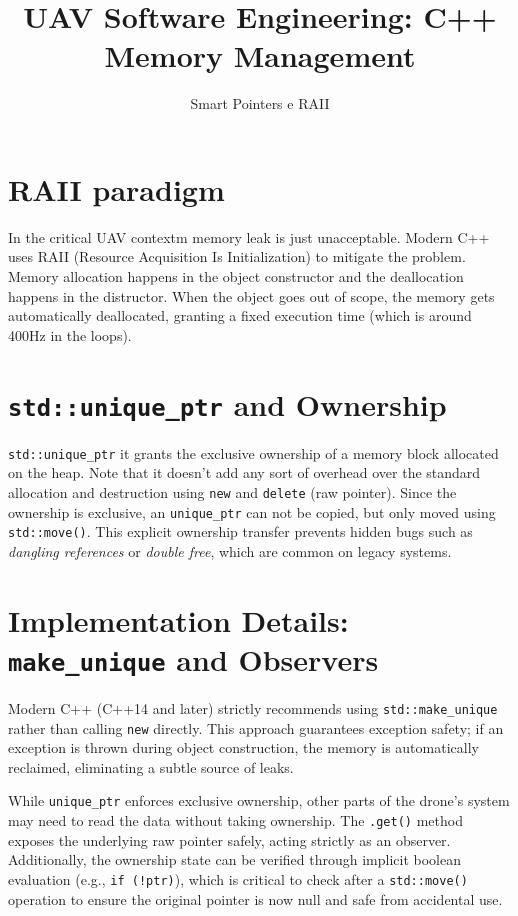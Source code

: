 \documentclass{article}
\title{UAV Software Engineering: C++ Memory Management}
\author{Smart Pointers e RAII}
\date{}
\begin{document}
\maketitle

\section{RAII paradigm}
In the critical UAV contextm memory leak is just unacceptable. 
Modern C++ uses RAII (Resource Acquisition Is Initialization) to mitigate the problem. 
Memory allocation happens in the object constructor and the deallocation happens in the distructor. 
When the object goes out of scope, the memory gets automatically deallocated, granting a fixed execution time (which is around 400Hz in the loops).

\section{\texttt{std::unique\_ptr} and Ownership}
\texttt{std::unique\_ptr} it grants the exclusive ownership of a memory block allocated on the heap. 
Note that it doesn't add any sort of overhead over the standard allocation and destruction using \texttt{new} and \texttt{delete} (raw pointer).
Since the ownership is exclusive, an \texttt{unique\_ptr} can not be copied, but only moved using \texttt{std::move()}. 
This explicit ownership transfer prevents hidden bugs such as \textit{dangling references} or \textit{double free}, which are common on legacy systems.

\section{Implementation Details: \texttt{make\_unique} and Observers}
Modern C++ (C++14 and later) strictly recommends using \texttt{std::make\_unique} rather than calling \texttt{new} directly. 
This approach guarantees exception safety; if an exception is thrown during object construction, the memory is automatically reclaimed, 
eliminating a subtle source of leaks.

While \texttt{unique\_ptr} enforces exclusive ownership, other parts of the drone's system may need to read the data without taking ownership.
The \texttt{.get()} method exposes the underlying raw pointer safely, acting strictly as an observer. 
Additionally, the ownership state can be verified through implicit boolean evaluation (e.g., \texttt{if (!ptr)}), 
which is critical to check after a \texttt{std::move()} operation to ensure the original pointer is now null and safe from accidental use.
\end{document}
